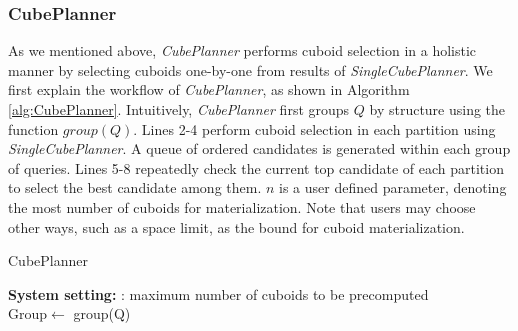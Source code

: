 	\subsubsection{CubePlanner}
	\label{CubePlanner}
	
	As we mentioned above, \emph{CubePlanner} performs cuboid selection in a holistic manner by  selecting cuboids one-by-one from results of \emph{SingleCubePlanner}. We first explain the workflow of \emph{CubePlanner}, as shown in Algorithm \ref{alg:CubePlanner}. %
	Intuitively, \emph{CubePlanner} first groups $Q$ by structure using the function $group(Q)$. Lines 2-4 perform cuboid selection in each partition using \emph{SingleCubePlanner}. A queue of ordered candidates is generated within each group of queries. Lines 5-8 repeatedly check the current top candidate of each partition to select the best candidate among them. $n$ is a user defined parameter, denoting the most number of cuboids for materialization.  Note that users may choose other ways, such as a space limit, as the bound for cuboid materialization.
	
	\begin{algorithm}%
		\label{alg:CubePlanner}
		\caption{CubePlanner}
		\LinesNumbered
		\textbf{System setting:}
		: maximum number of cuboids to be precomputed\\
		Group$\leftarrow$ group(Q)\;
		
		
	\end{algorithm}
	
	
	
